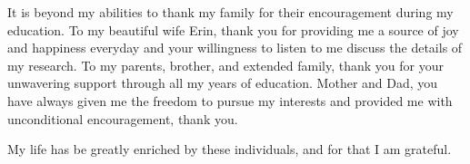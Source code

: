 It is beyond my abilities to thank my family for their encouragement during my
education. To my beautiful wife Erin, thank you for providing me a source of joy
and happiness everyday and your willingness to listen to me discuss the details
of my research. To my parents, brother, and extended family, thank you for your
unwavering support through all my years of education.  Mother and Dad, you have
always given me the freedom to pursue my interests and provided me with
unconditional encouragement, thank you.

My life has be greatly enriched by these individuals, and for that I am
grateful.


